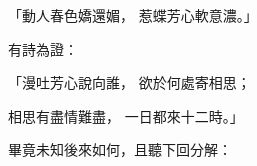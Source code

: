 \begin{showcontents}{}
「動人春色嬌還媚，  惹蝶芳心軟意濃。」

有詩為證：

「漫吐芳心說向誰，  欲於何處寄相思；

相思有盡情難盡，  一日都來十二時。」

畢竟未知後來如何，且聽下回分解：





\end{showcontents}


